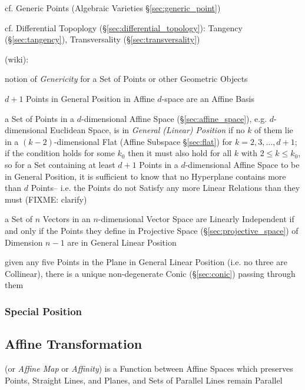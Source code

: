 \fist cf. Generic Points (Algebraic Varieties \S\ref{sec:generic_point})

\fist cf. Differential Topoplogy (\S\ref{sec:differential_topology}): Tangency
(\S\ref{sec:tangency}), Transversality (\S\ref{sec:transversality})

(wiki):

notion of \emph{Genericity} for a Set of Points or other Geometric Objects

$d+1$ Points in General Position in Affine $d$-space are an Affine Basis

a Set of Points in a $d$-dimensional Affine Space (\S\ref{sec:affine_space}),
e.g. $d$-dimensional Euclidean Space, is in \emph{General (Linear) Position} if
no $k$ of them lie in a $(k-2)$-dimensional Flat (Affine Subspace
\S\ref{sec:flat}) for $k = 2,3,\ldots,d+1$; if the condition holds for some
$k_0$ then it must also hold for all $k$ with $2 \leq k \leq k_0$, so for a
Set containing at least $d+1$ Points in a $d$-dimensional Affine Space to be in
General Position, it is sufficient to know that no Hyperplane contains more
than $d$ Points-- i.e. the Points do not Satisfy any more Linear Relations than
they must (FIXME: clarify)

a Set of $n$ Vectors in an $n$-dimensional Vector Space are Linearly
Independent if and only if the Points they define in Projective Space
(\S\ref{sec:projective_space}) of Dimension $n-1$ are in General Linear
Position

given any five Points in the Plane in General Linear Position (i.e. no three
are Collinear), there is a unique non-degenerate Conic (\S\ref{sec:conic})
passing through them



\subsubsection{Special Position}\label{sec:special_position}



\subsection{Affine Transformation}\label{sec:affine_transformation}

(or \emph{Affine Map} or \emph{Affinity}) is a Function between Affine
Spaces which preserves Points, Straight Lines, and Planes, and Sets of
Parallel Lines remain Parallel

